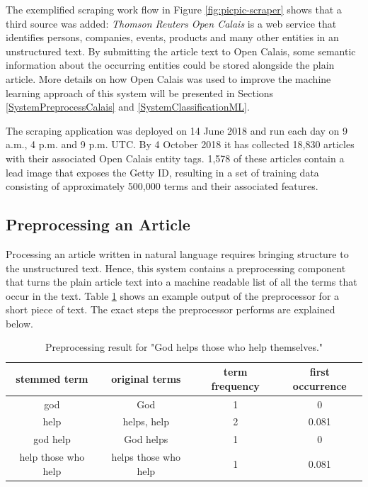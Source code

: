 \documentclass[11pt,a4paper,twoside]{article}
\begin{document}
The exemplified scraping work flow in Figure \ref{fig:picpic-scraper} shows that a third source was added: \emph{Thomson Reuters Open Calais} \cite{ThomsonReutersOpenCalais} is a web service that identifies persons, companies, events, products and many other entities in an unstructured text. By submitting the article text to Open Calais, some semantic information about the occurring entities could be stored alongside the plain article. More details on how Open Calais was used to improve the machine learning approach of this system will be presented in Sections \ref{SystemPreprocessCalais} and \ref{SystemClassificationML}.

The scraping application was deployed on 14 June 2018 and run each day on 9 a.m., 4 p.m. and 9 p.m. UTC. By 4 October 2018 it has collected 18,830 articles with their associated Open Calais entity tags. 1,578 of these articles contain a lead image that exposes the Getty ID, resulting in a set of training data consisting of approximately 500,000 terms and their associated features.

\subsection{Preprocessing an Article} \label{SystemPreprocess}

Processing an article written in natural language requires bringing structure to the unstructured text. Hence, this system contains a preprocessing component that turns the plain article text into a machine readable list of all the terms that occur in the text. Table \ref{table:term-examples} shows an example output of the preprocessor for a short piece of text. The exact steps the preprocessor performs are explained below.

\begin{table}[h!]
    \caption{Preprocessing result for "God helps those who help themselves."}
    \centering
    \begin{tabular}{|c|c|c|c|}
         \hline
         stemmed term & original terms & term frequency & first occurrence  \\
         \hline
         god          & God            & 1              & 0                 \\
         help         & helps, help    & 2              & 0.081             \\
         god help     & God helps      & 1              & 0                 \\
         help those who help & helps those who help & 1 & 0.081             \\
         \hline
    \end{tabular}
    \label{table:term-examples}
\end{table}
\end{document}
